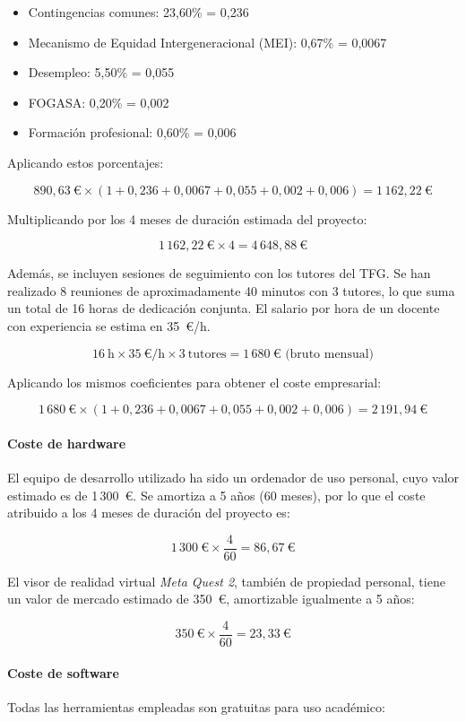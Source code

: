 \begin{itemize}
  \item Contingencias comunes: 23,60\% = 0,236
  \item Mecanismo de Equidad Intergeneracional (MEI): 0,67\% = 0,0067
  \item Desempleo: 5,50\% = 0,055
  \item FOGASA: 0,20\% = 0,002
  \item Formación profesional: 0,60\% = 0,006
\end{itemize}

Aplicando estos porcentajes:

\[
890{,}63~\text{€} \times \left(1 + 0{,}236 + 0{,}0067 + 0{,}055 + 0{,}002 + 0{,}006\right) = 1\,162{,}22~\text{€}
\]

Multiplicando por los 4 meses de duración estimada del proyecto:

\[
1\,162{,}22~\text{€} \times 4 = 4\,648{,}88~\text{€}
\]

Además, se incluyen sesiones de seguimiento con los tutores del TFG. Se han realizado 8 reuniones de aproximadamente 40 minutos con 3 tutores, lo que suma un total de 16 horas de dedicación conjunta. El salario por hora de un docente con experiencia se estima en 35~€/h.

\[
16~\text{h} \times 35~\text{€/h} \times 3~\text{tutores} = 1\,680~\text{€} \text{ (bruto mensual)}
\]

Aplicando los mismos coeficientes para obtener el coste empresarial:

\[
1\,680~\text{€} \times \left(1 + 0{,}236 + 0{,}0067 + 0{,}055 + 0{,}002 + 0{,}006\right) = 2\,191{,}94~\text{€}
\]

\paragraph{Coste de hardware}
El equipo de desarrollo utilizado ha sido un ordenador de uso personal, cuyo valor estimado es de 1\,300~€. Se amortiza a 5 años (60 meses), por lo que el coste atribuido a los 4 meses de duración del proyecto es:

\[
1\,300~\text{€} \times \frac{4}{60} = 86{,}67~\text{€}
\]

El visor de realidad virtual \textit{Meta Quest 2}, también de propiedad personal, tiene un valor de mercado estimado de 350~€, amortizable igualmente a 5 años:

\[
350~\text{€} \times \frac{4}{60} = 23{,}33~\text{€}
\]

\paragraph{Coste de software}
Todas las herramientas empleadas son gratuitas para uso académico:

